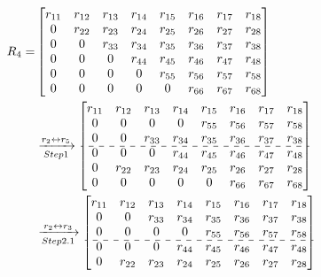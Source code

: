 \documentclass{book}
\theoremstyle{remark}
\begin{document}
\begin{multicols}{2}
\begin{align*}
R_4 =
& \begin{bmatrix}
 r_{11} & r_{12} & r_{13} & r_{14} & r_{15} & r_{16} & r_{17} & r_{18}\\
 0      & r_{22} & r_{23} & r_{24} & r_{25} & r_{26} & r_{27} & r_{28}\\
 0      & 0      & r_{33} & r_{34} & r_{35} & r_{36} & r_{37} & r_{38}\\
 0      & 0      & 0      & r_{44} & r_{45} & r_{46} & r_{47} & r_{48}\\
 0      & 0      & 0      & 0      & r_{55} & r_{56} & r_{57} & r_{58}\\
 0      & 0      & 0      & 0      & 0      & r_{66} & r_{67} & r_{68}\\
\end{bmatrix}\\
& \xrightarrow[Step1]{r_{2} \leftrightarrow r_{5}}
\begin{bmatrix}
 r_{11} & r_{12} & r_{13} & r_{14} & r_{15} & r_{16} & r_{17} & r_{18}\\
 0      & 0      & 0      & 0      & r_{55} & r_{56} & r_{57} & r_{58}\\
 0      & 0      & r_{33} & r_{34} & r_{35} & r_{36} & r_{37} & r_{38}\\
 \cdashline{1-8}
 0      & 0      & 0      & r_{44} & r_{45} & r_{46} & r_{47} & r_{48}\\
 0      & r_{22} & r_{23} & r_{24} & r_{25} & r_{26} & r_{27} & r_{28}\\
 0      & 0      & 0      & 0      & 0      & r_{66} & r_{67} & r_{68}\\
\end{bmatrix}\\
&\xrightarrow[Step2.1]{r_{2} \leftrightarrow r_{3}}
\begin{bmatrix}
 r_{11} & r_{12} & r_{13} & r_{14} & r_{15} & r_{16} & r_{17} & r_{18}\\
 0      & 0      & r_{33} & r_{34} & r_{35} & r_{36} & r_{37} & r_{38}\\
 0      & 0      & 0      & 0      & r_{55} & r_{56} & r_{57} & r_{58}\\
 \cdashline{1-8}
 0      & 0      & 0      & r_{44} & r_{45} & r_{46} & r_{47} & r_{48}\\
 0      & r_{22} & r_{23} & r_{24} & r_{25} & r_{26} & r_{27} & r_{28}\\

\end{bmatrix}
\end{align*}
\end{multicols}
\end{document}
